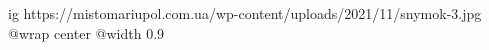  
 
 
 
 

\ifcmt
  ig https://mistomariupol.com.ua/wp-content/uploads/2021/11/snymok-3.jpg
  @wrap center
  @width 0.9
\fi
